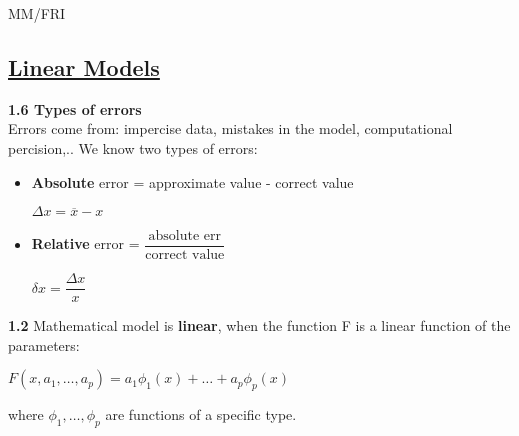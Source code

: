 \documentclass{article}
\begin{document}
\begin{center}
    {\small MM/FRI \par}
\end{center}

\begin{multicols}{3}

\section{\underline{Linear Models}}

\textbf{1.6 Types of errors}\\
Errors come from: impercise data, mistakes in the model, computational percision,..
We know two types of errors:
\begin{itemize}
    \item \textbf{Absolute} error = approximate value - correct value
        \begin{center}
            \begin{math}
                \Delta x = \overline{x} - x
            \end{math}
        \end{center}
    \item \textbf{Relative} error = $\dfrac{\text{absolute err}}{\text{correct value}}$ 
        \begin{center}
            \begin{math}
                \delta x = \dfrac{\Delta x}{x}
            \end{math}
        \end{center}
\end{itemize}

\textbf{1.2} Mathematical model is \textbf{linear},
when the function F is a linear function of the parameters:
\begin{center}
    \begin{math}
        F(x, a_1, \dots, a_p) = a_1 \phi_1(x) + \dots + a_p \phi_p(x) 
    \end{math}
\end{center} 
where $\phi_1, \dots, \phi_p$ are functions of a specific type.



\end{multicols}
\end{document}
